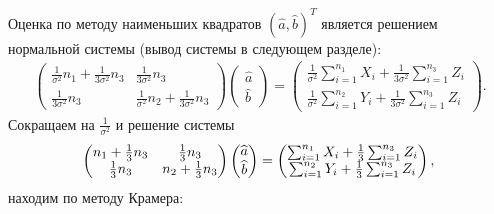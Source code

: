 Оценка по методу наименьших квадратов $(\widehat{a}, \widehat{b})^T$ является решением нормальной системы (вывод системы в следующем разделе):
\begin{gather}
    \begin{pmatrix}
        \frac{1}{\sigma^2} n_1 + \frac{1}{3 \sigma^2} n_3 & \frac{1}{3 \sigma^2} n_3                          \\
        \frac{1}{3 \sigma^2} n_3                          & \frac{1}{\sigma^2} n_2 + \frac{1}{3 \sigma^2} n_3
    \end{pmatrix}
    \begin{pmatrix}
        \widehat{a} \\
        \widehat{b}
    \end{pmatrix}
    =
    \begin{pmatrix}
        \frac{1}{\sigma^2} \sum_{i=1}^{n_1} X_i + \frac{1}{3 \sigma^2} \sum_{i=1}^{n_3} Z_i \\
        \frac{1}{\sigma^2} \sum_{i=1}^{n_2} Y_i + \frac{1}{3 \sigma^2} \sum_{i=1}^{n_3} Z_i
    \end{pmatrix}
    .
\end{gather}
Сокращаем на $\frac{1}{\sigma^2}$ и решение системы
\begin{equation}
    \begin{pmatrix}
        n_1 + \frac{1}{3} n_3 & \frac{1}{3} n_3       \\
        \frac{1}{3} n_3       & n_2 + \frac{1}{3} n_3
    \end{pmatrix}
    \begin{pmatrix}
        \widehat{a} \\
        \widehat{b}
    \end{pmatrix}
    =
    \begin{pmatrix}
        \sum_{i=1}^{n_1} X_i + \frac{1}{3} \sum_{i=1}^{n_3} Z_i \\
        \sum_{i=1}^{n_2} Y_i + \frac{1}{3} \sum_{i=1}^{n_3} Z_i
    \end{pmatrix} , \\
\end{equation}
находим по методу Крамера:
